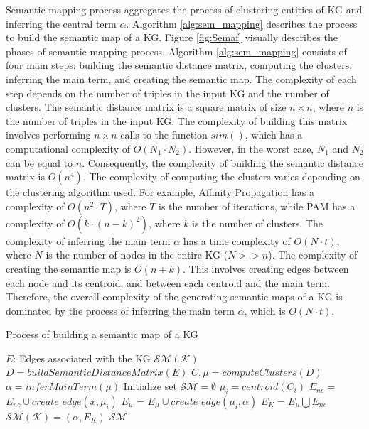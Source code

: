 \documentclass{ieeeaccess}
\begin{document}
Semantic mapping process aggregates the process of 
clustering entities of KG and inferring the central 
term $\alpha$. Algorithm \ref{alg:sem_mapping} 
describes the process to build the semantic map of a 
KG. Figure \ref{fig:Semaf} visually describes the 
phases of semantic mapping process. Algorithm 
\ref{alg:sem_mapping} consists of 
four main steps: building the semantic distance matrix, 
computing the clusters, inferring the main
term, and creating the semantic map. The
complexity of each step depends on the number
of triples in the input KG and the number
of clusters. The semantic distance matrix
is a square matrix of size $n \times n$,
where $n$ is the number of triples in the
input KG. The complexity of building this 
matrix involves performing $n \times n$ 
calls to the function $sim()$, which has a 
computational complexity of 
$O(N_{1} \cdot N_{2})$. However, in the
worst case, $N_{1}$ and $N_{2}$ can be
equal to $n$. Consequently, the complexity
of building the semantic distance matrix
is $O(n^4)$. The complexity of computing 
the clusters varies depending on the 
clustering algorithm used. For example,
Affinity Propagation has a complexity 
of $O(n^2 \cdot T)$, where $T$ is the 
number of iterations, while PAM has a 
complexity of $O(k \cdot (n-k)^2)$,
where $k$ is the number of clusters. The
complexity of inferring the main term
$\alpha$ has a time complexity of $O(N \cdot t)$,
where $N$ is the number of nodes in 
the entire KG ($N >> n$). The complexity
of creating the semantic map is $O(n + k)$.
This involves creating edges between each
node and its centroid, and between each
centroid and the main term. Therefore, the
overall complexity of the generating
semantic maps of a KG is dominated by 
the process of inferring the main term
$\alpha$, which is $O(N \cdot t)$.

\begin{algorithm}
\caption{Process of building a semantic map of a KG}
\label{alg:sem_mapping}
\begin{algorithmic}[1]
\renewcommand{\algorithmicrequire}{\textbf{Input:}}
\renewcommand{\algorithmicensure}{\textbf{Output:}}
\REQUIRE $E$: Edges associated with the KG
\ENSURE $\mathcal{SM(K)}$
\STATE $D = buildSemanticDistanceMatrix(E)$
\STATE $C, \mu = computeClusters(D)$
\STATE $\alpha = inferMainTerm(\mu)$
\STATE Initialize set $\mathcal{SM} = \emptyset$
    \STATE $\mu_{i} = centroid(C_{i})$
        \STATE $E_{nc}$ =  $ E_{nc} \cup create\_edge(x, \mu_{i})$ 
    \ENDFOR
\ENDFOR
{}
    \STATE $E_{\mu}$ =  $E_{\mu} \cup create\_edge(\mu_{i}, \alpha)$
\ENDFOR
\STATE $E_{K} = E_{\mu} \bigcup E_{nc}$
\STATE $\mathcal{SM(K)} = (\alpha, E_{K})$
\RETURN $\mathcal{SM}$
\end{algorithmic} 
\end{algorithm}
\end{document}
